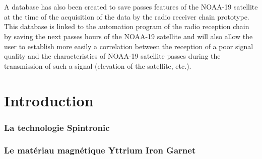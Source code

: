 \documentclass[12pt,fleqn]{book} %
\begin{document}
~ \\\\A database has also been created to save passes features of the NOAA-19 satellite at the time of the acquisition of the data by the radio receiver chain prototype. This database is linked to the automation program of the radio reception chain by saving the next passes hours of the NOAA-19 satellite and will also allow the user to establish more easily a correlation between the reception of a poor signal quality and the characteristics of NOAA-19 satellite passes during the transmission of such a signal (elevation of the satellite, etc.).




\pagestyle{empty} %

\tableofcontents %

\pagestyle{fancy}
\part{Introduction}

\setcounter{chapter}{1}
\section{La technologie Spintronic}

\section{Le matériau magnétique Yttrium Iron Garnet}
\end{document}
